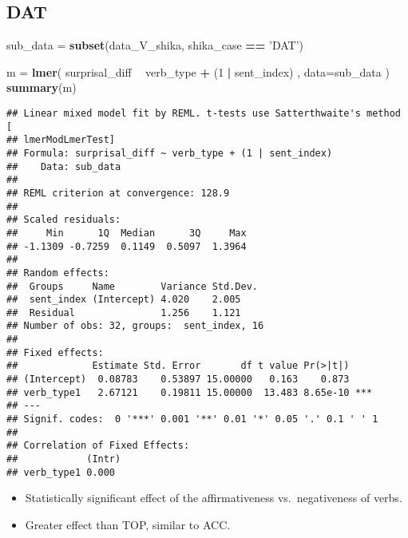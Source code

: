 \documentclass[]{ltjsarticle}
\newenvironment{Shaded}{\begin{snugshade}}{\end{snugshade}}
\newcommand{\KeywordTok}[1]{\textcolor[rgb]{0.13,0.29,0.53}{\textbf{#1}}}
\newcommand{\DataTypeTok}[1]{\textcolor[rgb]{0.13,0.29,0.53}{#1}}
\newcommand{\DecValTok}[1]{\textcolor[rgb]{0.00,0.00,0.81}{#1}}
\newcommand{\StringTok}[1]{\textcolor[rgb]{0.31,0.60,0.02}{#1}}
\newcommand{\OperatorTok}[1]{\textcolor[rgb]{0.81,0.36,0.00}{\textbf{#1}}}
\newcommand{\NormalTok}[1]{#1}
\providecommand{\tightlist}{%
  \setlength{\itemsep}{0pt}\setlength{\parskip}{0pt}}
\begin{document}
\subsection{DAT}\label{dat}

\begin{Shaded}
\begin{Highlighting}[]
\NormalTok{sub_data =}\StringTok{ }\KeywordTok{subset}\NormalTok{(data_V_shika, shika_case }\OperatorTok{==}\StringTok{ 'DAT'}\NormalTok{)}

\NormalTok{m =}\StringTok{ }\KeywordTok{lmer}\NormalTok{(}
\NormalTok{        surprisal_diff}
            \OperatorTok{~}\StringTok{ }\NormalTok{verb_type}
                \OperatorTok{+}\StringTok{ }\NormalTok{(}\DecValTok{1} \OperatorTok{|}\StringTok{ }\NormalTok{sent_index)}
\NormalTok{        ,}
        \DataTypeTok{data=}\NormalTok{sub_data}
\NormalTok{        )}
\KeywordTok{summary}\NormalTok{(m)}
\end{Highlighting}
\end{Shaded}

\begin{verbatim}
## Linear mixed model fit by REML. t-tests use Satterthwaite's method [
## lmerModLmerTest]
## Formula: surprisal_diff ~ verb_type + (1 | sent_index)
##    Data: sub_data
## 
## REML criterion at convergence: 128.9
## 
## Scaled residuals: 
##     Min      1Q  Median      3Q     Max 
## -1.1309 -0.7259  0.1149  0.5097  1.3964 
## 
## Random effects:
##  Groups     Name        Variance Std.Dev.
##  sent_index (Intercept) 4.020    2.005   
##  Residual               1.256    1.121   
## Number of obs: 32, groups:  sent_index, 16
## 
## Fixed effects:
##             Estimate Std. Error       df t value Pr(>|t|)    
## (Intercept)  0.08783    0.53897 15.00000   0.163    0.873    
## verb_type1   2.67121    0.19811 15.00000  13.483 8.65e-10 ***
## ---
## Signif. codes:  0 '***' 0.001 '**' 0.01 '*' 0.05 '.' 0.1 ' ' 1
## 
## Correlation of Fixed Effects:
##            (Intr)
## verb_type1 0.000
\end{verbatim}

\begin{itemize}
\tightlist
\item
  Statistically significant effect of the affirmativeness
  vs.~negativeness of verbs.
\item
  Greater effect than TOP, similar to ACC.
\end{itemize}
\end{document}
